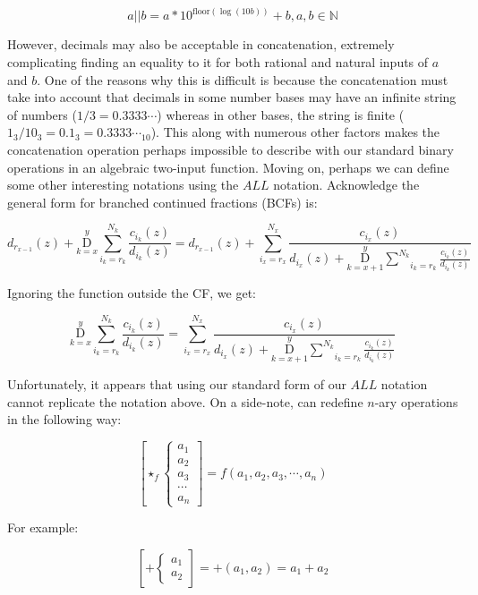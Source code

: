 \documentclass{article}
\begin{document}
$$a || b = a*10^{\text{floor}(\log(10b))}+b, a,b \in \mathbb{N}$$

However, decimals may also be acceptable in concatenation, extremely complicating finding an equality to it for both rational and natural inputs of $a$ and $b$. One of the reasons why this is difficult is because the concatenation must take into account that decimals in some number bases may have an infinite string of numbers ($1 / 3= 0.3333\cdots$) whereas in other bases, the string is finite ($1_3 / 10_3 = 0.1_3 = 0.3333\cdots_{10}$). This along with numerous other factors makes the concatenation operation perhaps impossible to describe with our standard binary operations in an algebraic two-input function. Moving on, perhaps we can define some other interesting notations using the $ALL$ notation. Acknowledge the general form for branched continued fractions (BCFs) is:

$$d_{r_{x-1}}(z) + \underset{k=x}{\overset{y}{ \mathrm D}} \underset{i_k=r_k}{\overset{N_k}{ \sum}} \frac{c_{i_k} (z)}{d_{i_k} (z)} = d_{r_{x-1}}(z)+ \underset{i_x=r_x}{\overset{N_x}{ \sum}} \frac{c_{i_x}(z)}{d_{i_x}(z)+ \underset{k=x+1}{\overset{y}{ \mathrm D}} \underset{i_k=r_k}{\overset{N_k}{ \sum}} \frac{c_{i_k} (z)}{d_{i_k} (z)}}$$

Ignoring the function outside the CF, we get:

$$\underset{k=x}{\overset{y}{ \mathrm D}} \underset{i_k=r_k}{\overset{N_k}{ \sum}} \frac{c_{i_k} (z)}{d_{i_k} (z)} = \underset{i_x=r_x}{\overset{N_x}{ \sum}} \frac{c_{i_x}(z)}{d_{i_x}(z)+ \underset{k=x+1}{\overset{y}{ \mathrm D}} \underset{i_k=r_k}{\overset{N_k}{ \sum}} \frac{c_{i_k} (z)}{d_{i_k} (z)}}$$

Unfortunately, it appears that using our standard form of our $ALL$ notation cannot replicate the notation above. On a side-note, can redefine $n$-ary operations in the following way:

$$\left[ \star_f \left\{ \begin{array}{rcl}
a_1 \\ a_2 \\ a_3 \\ \cdots \\ a_n
\end{array}\right. \right] = f(a_1, a_2, a_3, \cdots, a_n)$$

For example:

$$\left[ + \left\{ \begin{array}{rcl}
a_1 \\ a_2 \end{array}\right. \right] = +(a_1,a_2)=a_1+a_2$$
\end{document}
